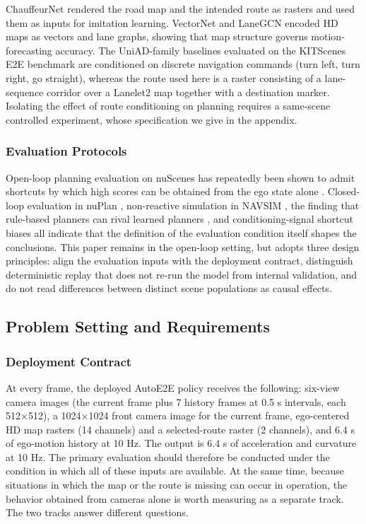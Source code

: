 \documentclass[
  english,
  10pt,
]{article}
\begin{document}
ChauffeurNet \hyperref[ref-chauffeurnet]{}rendered the road map and the
intended route as rasters and used them as inputs for imitation
learning. VectorNet \hyperref[ref-vectornet]{}and LaneGCN
\hyperref[ref-lanegcn]{}encoded HD maps as vectors and lane graphs,
showing that map structure governs motion-forecasting accuracy. The
UniAD-family baselines evaluated on the KITScenes
\hyperref[ref-kitscenes]{}E2E benchmark are conditioned on discrete
navigation commands (turn left, turn right, go straight), whereas the
route used here is a raster consisting of a lane-sequence corridor over
a Lanelet2 \hyperref[ref-lanelet2]{}map together with a destination
marker. Isolating the effect of route conditioning on planning requires
a same-scene controlled experiment, whose specification we give in the
appendix.

\subsubsection{Evaluation Protocols}\label{evaluation-protocols}

Open-loop planning evaluation on nuScenes has repeatedly been shown to
admit shortcuts by which high scores can be obtained from the ego state
alone \hyperref[ref-admlp]{}\hyperref[ref-egostatus]{}. Closed-loop
evaluation in nuPlan \hyperref[ref-nuplan]{}, non-reactive simulation in
NAVSIM \hyperref[ref-navsim]{}, the finding that rule-based planners can
rival learned planners \hyperref[ref-pdm]{}, and conditioning-signal
shortcut biases \hyperref[ref-hidden]{}all indicate that the definition
of the evaluation condition itself shapes the conclusions. This paper
remains in the open-loop setting, but adopts three design principles:
align the evaluation inputs with the deployment contract, distinguish
deterministic replay that does not re-run the model from internal
validation, and do not read differences between distinct scene
populations as causal effects.

\subsection{Problem Setting and
Requirements}\label{problem-setting-and-requirements}

\subsubsection{Deployment Contract}\label{deployment-contract}

At every frame, the deployed AutoE2E policy receives the following:
six-view camera images (the current frame plus 7 history frames at 0.5 s
intervals, each 512×512), a 1024×1024 front camera image for the current
frame, ego-centered HD map rasters (14 channels) and a selected-route
raster (2 channels), and 6.4 s of ego-motion history at 10 Hz. The
output is 6.4 s of acceleration and curvature at 10 Hz. The primary
evaluation should therefore be conducted under the condition in which
all of these inputs are available. At the same time, because situations
in which the map or the route is missing can occur in operation, the
behavior obtained from cameras alone is worth measuring as a separate
track. The two tracks answer different questions.
\end{document}
